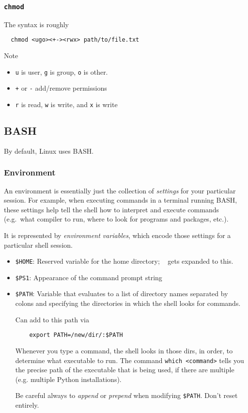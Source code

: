 \documentclass[12pt]{article}
\theoremstyle{plain}
\theoremstyle{definition}
\theoremstyle{remark}
\begin{document}
\clearpage
\subsubsection{\texttt{chmod}}

The syntax is roughly
\begin{lstlisting}
  chmod <ugo><+-><rwx> path/to/file.txt
\end{lstlisting}
Note
\begin{itemize}
  \item \texttt{u} is user, \texttt{g} is group, \texttt{o} is other.
  \item \texttt{+} or \texttt{-} add/remove permissions
  \item \texttt{r} is read, \texttt{w} is write, and \texttt{x} is
    write
\end{itemize}


\clearpage
\subsection{BASH}

 By default, Linux uses BASH.


\subsubsection{Environment}

An environment is essentially just the collection of \emph{settings} for
your particular session.
For example, when executing commands in a terminal running BASH, these
settings help tell the shell how to interpret and execute commands
(e.g.\ what compiler to run, where to look for programs and packages,
etc.).

It is represented by \emph{environment variables}, which encode those
settings for a particular shell session.
\begin{itemize}
  \item \texttt{\$HOME}:
    Reserved variable for the home directory;
    \texttt{~} gets expanded to this.
  \item \texttt{\$PS1}: Appearance of the command prompt string
  \item \texttt{\$PATH}:
    Variable that evaluates to a list of directory names separated by
    colons and specifying the directories in which the shell looks for
    commands.

    Can add to this path via
    \lstset{style=bash}
    \begin{lstlisting}
    export PATH=/new/dir/:$PATH
    \end{lstlisting}
    Whenever you type a command, the shell looks in those dirs, in
    order, to determine what executable to run.
    The command
    \texttt{which <command>}
    tells you the precise path of the executable that is being used, if
    there are multiple (e.g. multiple Python installations).

    Be careful always to \emph{append} or \emph{prepend} when modifying
    \texttt{\$PATH}. Don't reset entirely.
\end{itemize}
\end{document}
